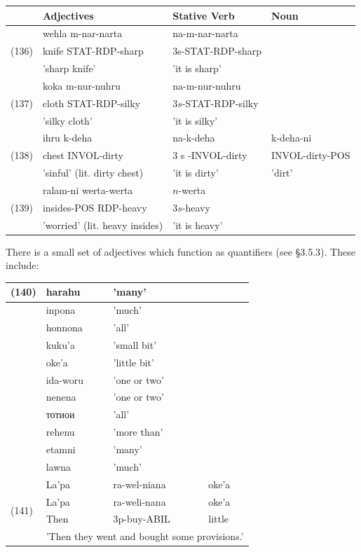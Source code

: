 \documentclass[10pt]{article}
\begin{document}
\begin{center}
\begin{tabular}{|l|l|l|l|}
\hline
 & Adjectives & Stative Verb & Noun \\
\hline
\multirow[t]{3}{*}{(136)} & wehla m-nar-narta & na-m-nar-narta &  \\
\hline
 & knife STAT-RDP-sharp & 3s-STAT-RDP-sharp &  \\
\hline
 & 'sharp knife' & 'it is sharp' &  \\
\hline
\multirow[t]{3}{*}{(137)} & koka m-nur-nuhru & na-m-nur-nuhru &  \\
\hline
 & cloth STAT-RDP-silky & \(3 s\)-STAT-RDP-silky &  \\
\hline
 & 'silky cloth' & 'it is silky' &  \\
\hline
\multirow[t]{3}{*}{(138)} & ihru k-deha & na-k-deha & k-deha-ni \\
\hline
 & chest INVOL-dirty & 3 s -INVOL-dirty & INVOL-dirty-POS \\
\hline
 & 'sinful' (lit. dirty chest) & 'it is dirty' & 'dirt' \\
\hline
\multirow[t]{3}{*}{(139)} & ralam-ni werta-werta & \(n\)-werta &  \\
\hline
 & insides-POS RDP-heavy & \(3 s\)-heavy &  \\
\hline
 & 'worried' (lit. heavy insides) & 'it is heavy' &  \\
\hline
\end{tabular}
\end{center}

There is a small set of adjectives which function as quantifiers (see §3.5.3). These include:

\begin{center}
\begin{tabular}{|l|l|l|l|}
\hline
\multirow[t]{11}{*}{(140)} & harahu & 'many' &  \\
\hline
 & inpona & 'much' &  \\
\hline
 & honnona & 'all' &  \\
\hline
 & kuku'a & 'small bit' &  \\
\hline
 & oke'a & 'little bit' &  \\
\hline
 & ida-woru & 'one or two' &  \\
\hline
 & nenena & 'one or two' &  \\
\hline
 & тотиои & 'all' &  \\
\hline
 & rehenu & 'more than' &  \\
\hline
 & etamni & 'many' &  \\
\hline
 & lawna & 'much' &  \\
\hline
\multirow[t]{4}{*}{(141)} & La'pa & ra-wel-niana & oke'a \\
\hline
 & La'pa & ra-weli-nana & oke'a \\
\hline
 & Then & 3p-buy-ABIL & little \\
\hline
 & \multicolumn{3}{|c|}{'Then they went and bought some provisions.'} \\
\hline
\end{tabular}
\end{center}
\end{document}
